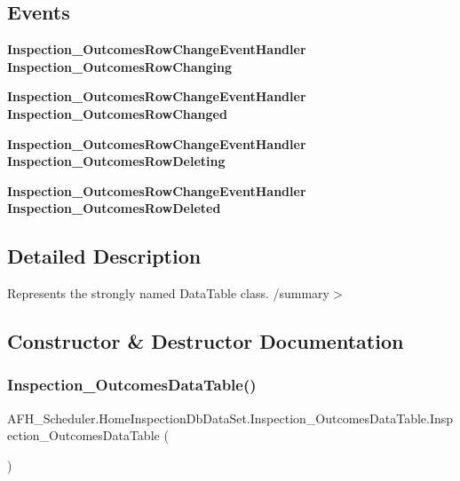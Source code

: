 \subsection*{Events}
\begin{DoxyCompactItemize}
\item 
\textbf{ Inspection\+\_\+\+Outcomes\+Row\+Change\+Event\+Handler} \textbf{ Inspection\+\_\+\+Outcomes\+Row\+Changing}
\item 
\textbf{ Inspection\+\_\+\+Outcomes\+Row\+Change\+Event\+Handler} \textbf{ Inspection\+\_\+\+Outcomes\+Row\+Changed}
\item 
\textbf{ Inspection\+\_\+\+Outcomes\+Row\+Change\+Event\+Handler} \textbf{ Inspection\+\_\+\+Outcomes\+Row\+Deleting}
\item 
\textbf{ Inspection\+\_\+\+Outcomes\+Row\+Change\+Event\+Handler} \textbf{ Inspection\+\_\+\+Outcomes\+Row\+Deleted}
\end{DoxyCompactItemize}


\subsection{Detailed Description}
Represents the strongly named Data\+Table class. /summary$>$ 

\subsection{Constructor \& Destructor Documentation}
\mbox{\label{class_a_f_h___scheduler_1_1_home_inspection_db_data_set_1_1_inspection___outcomes_data_table_a50440acb62d7bfcacaa4c639a443d9f9}} 
\subsubsection{Inspection\_OutcomesDataTable()\hspace{0.1cm}{\footnotesize\ttfamily [1/2]}}
{\footnotesize\ttfamily A\+F\+H\+\_\+\+Scheduler.\+Home\+Inspection\+Db\+Data\+Set.\+Inspection\+\_\+\+Outcomes\+Data\+Table.\+Inspection\+\_\+\+Outcomes\+Data\+Table (\begin{DoxyParamCaption}{ }\end{DoxyParamCaption})}

